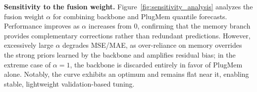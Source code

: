 \noindent\textbf{Sensitivity to the fusion weight.}
\label{sec:model_analysis_sensitivity_alpha}
Figure~\ref {fig:sensitivity_analysis} analyzes the fusion weight $\alpha$ for combining backbone and PlugMem quantile forecasts. Performance improves as $\alpha$ increases from 0, confirming that the memory branch provides complementary corrections rather than redundant predictions. However, excessively large $\alpha$ degrades MSE/MAE, as over-reliance on memory overrides the strong priors learned by the backbone and amplifies residual bias; in the extreme case of $\alpha=1$, the backbone is discarded entirely in favor of PlugMem alone. Notably, the curve exhibits an optimum and remains flat near it, enabling stable, lightweight validation-based tuning.




